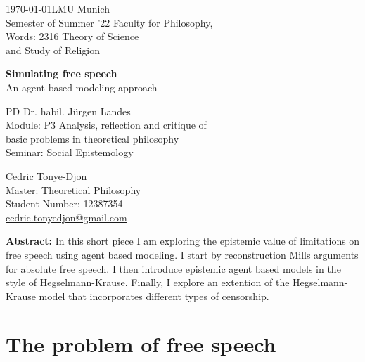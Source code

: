 \documentclass{essay-formal}
\begin{document}
\begin{titlepage}
  \thispagestyle{empty}

  {\noindent\Large \today \hfill LMU Munich\\}
  Semester of Summer '22 \hfill Faculty for Philosophy,\\
  Words: 2316 \hfill Theory of Science\\
  \raggedleft and Study of Religion
    
    
  \vfill
  \begin{center}
      \noindent \textbf{{\Huge Simulating free speech\\}}
      \vspace{.5em}
      {\Large An agent based modeling approach}
  \end{center}
    
  \vfill

  \begin{center}
      {\noindent\Large PD Dr. habil. Jürgen Landes\\}
      Module: P3 Analysis, reflection and critique of\\ 
      basic problems in theoretical philosophy\\
      Seminar: Social Epistemology

      \vspace{3em}

      {\noindent \Large Cedric Tonye-Djon\\}
      Master: Theoretical Philosophy\\
      Student Number: 12387354\\
      \href{mailto:cedric.tonyedjon@gmail.com}{cedric.tonyedjon@gmail.com}
  \end{center}
    
\end{titlepage}

\tableofcontents
\clearpage


\textbf{Abstract:} In this short piece I am exploring the epistemic value of limitations on free speech using agent based modeling. I start by reconstruction Mills arguments for absolute free speech. I then introduce epistemic agent based models in the style of Hegselmann-Krause. Finally, I explore an extention of the Hegselmann-Krause model that incorporates different types of censorship.

\section{The problem of free speech}
\end{document}
